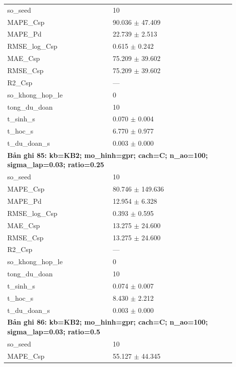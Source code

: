 \begin{longtable}{p{0.43\linewidth}p{0.50\linewidth}}
so\_\allowbreak seed & 10 \\
MAPE\_\allowbreak Csp & 90.036 $\pm$ 47.409 \\
MAPE\_\allowbreak Pd & 22.739 $\pm$ 2.513 \\
RMSE\_\allowbreak log\_\allowbreak Csp & 0.615 $\pm$ 0.242 \\
MAE\_\allowbreak Csp & 75.209 $\pm$ 39.602 \\
RMSE\_\allowbreak Csp & 75.209 $\pm$ 39.602 \\
R2\_\allowbreak Csp & — \\
so\_\allowbreak khong\_\allowbreak hop\_\allowbreak le & 0 \\
tong\_\allowbreak du\_\allowbreak doan & 10 \\
t\_\allowbreak sinh\_\allowbreak s & 0.070 $\pm$ 0.004 \\
t\_\allowbreak hoc\_\allowbreak s & 6.770 $\pm$ 0.977 \\
t\_\allowbreak du\_\allowbreak doan\_\allowbreak s & 0.003 $\pm$ 0.000 \\
\midrule
\multicolumn{2}{p{0.95\linewidth}}{\textbf{Bản ghi 85: kb=KB2; mo\_hinh=gpr; cach=C; n\_ao=100; sigma\_lap=0.03; ratio=0.25}} \\
so\_\allowbreak seed & 10 \\
MAPE\_\allowbreak Csp & 80.746 $\pm$ 149.636 \\
MAPE\_\allowbreak Pd & 12.954 $\pm$ 6.328 \\
RMSE\_\allowbreak log\_\allowbreak Csp & 0.393 $\pm$ 0.595 \\
MAE\_\allowbreak Csp & 13.275 $\pm$ 24.600 \\
RMSE\_\allowbreak Csp & 13.275 $\pm$ 24.600 \\
R2\_\allowbreak Csp & — \\
so\_\allowbreak khong\_\allowbreak hop\_\allowbreak le & 0 \\
tong\_\allowbreak du\_\allowbreak doan & 10 \\
t\_\allowbreak sinh\_\allowbreak s & 0.074 $\pm$ 0.007 \\
t\_\allowbreak hoc\_\allowbreak s & 8.430 $\pm$ 2.212 \\
t\_\allowbreak du\_\allowbreak doan\_\allowbreak s & 0.003 $\pm$ 0.000 \\
\midrule
\multicolumn{2}{p{0.95\linewidth}}{\textbf{Bản ghi 86: kb=KB2; mo\_hinh=gpr; cach=C; n\_ao=100; sigma\_lap=0.03; ratio=0.5}} \\
so\_\allowbreak seed & 10 \\
MAPE\_\allowbreak Csp & 55.127 $\pm$ 44.345 \\

\end{longtable}
